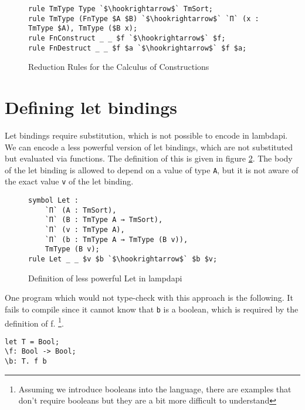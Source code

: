 \begin{figure}[ht]
	\begin{lstlisting}
rule TmType Type `$\hookrightarrow$` TmSort;
rule TmType (FnType $A $B) `$\hookrightarrow$` `Π` (x : TmType $A), TmType ($B x);
rule FnConstruct _ _ $f `$\hookrightarrow$` $f;
rule FnDestruct _ _ $f $a `$\hookrightarrow$` $f $a;
	\end{lstlisting}
	\caption{Reduction Rules for the Calculus of Constructions}
	\label{fig:lp-rules}
\end{figure}

\section{\label{ch:comp-lambdapi:let}Defining let bindings}

Let bindings require substitution, which is not possible to encode in lambdapi. We can encode a less powerful version of let bindings, which are not substituted but evaluated via functions. The definition of this is given in figure \ref{fig:lp-let}. The body of the let binding is allowed to depend on a value of type \verb|A|, but it is not aware of the exact value \verb|v| of the let binding. 

\begin{figure}[ht]
	\begin{lstlisting}
symbol Let : 
	`Π` (A : TmSort), 
	`Π` (B : TmType A → TmSort), 
	`Π` (v : TmType A),
	`Π` (b : TmType A → TmType (B v)),
	TmType (B v);
rule Let _ _ $v $b `$\hookrightarrow$` $b $v;
	\end{lstlisting}
	\caption{Definition of less powerful Let in lampdapi}
	\label{fig:lp-let}
\end{figure}

One program which would not type-check with this approach is the following. It fails to compile since it cannot know that \verb|b| is a boolean, which is required by the definition of f. \footnote{Assuming we introduce booleans into the language, there are examples that don't require booleans but they are a bit more difficult to understand}.
\begin{lstlisting}
let T = Bool;
\f: Bool -> Bool;
\b: T. f b
\end{lstlisting}
